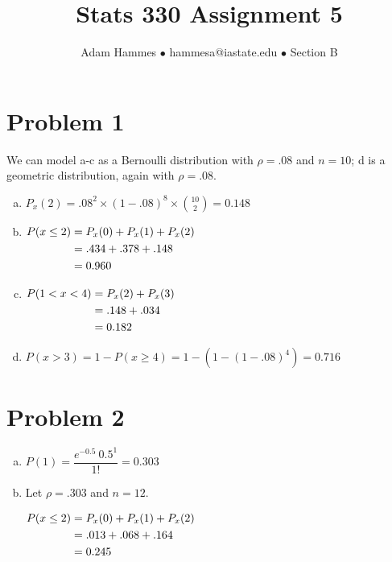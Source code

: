 \documentclass[11pt]{article}
\newenvironment{equ}{$\hfill\begin{aligned}[t]}{\end{aligned}\hfill \null$}
\begin{document}
\title{\vspace{-8ex}Stats 330 Assignment 5}
\author{Adam Hammes $\bullet$ hammesa@iastate.edu $\bullet$ Section B}
\maketitle

\section*{Problem 1}
We can model a-c as a Bernoulli distribution with $\rho = .08$ and $n=10$; d is a geometric distribution, again with $\rho = .08$.


\begin{enumerate}[(a)]	
	\item $P_x(2) = .08^2 \times (1-.08)^8 \times \binom{10}{2} = 0.148$
	\item
		\begin{equ}
			P(x \leq 2)&= P_x(0) + P_x(1) + P_x(2) \\
			&= .434 + .378 + .148 \\
			&=0 .960
		\end{equ}
	\item
		\begin{equ}
			P( 1 < x < 4) &= P_x(2) + P_x(3) \\
			&= .148 + .034 \\
			&= 0.182
		\end{equ}
	\item $P( x > 3 ) =1- P( x \geq 4) = 1-(1- (1-.08)^4) = 0.716$
\end{enumerate}

\section*{Problem 2}

\begin{enumerate}[(a)]
	\item $P(1) = \dfrac{e^{-0.5}\ 0.5 ^ 1}{1!} = 0.303$
	\item Let $\rho = .303$ and $n =12$.
	
		\begin{equ}
			P(x \leq 2) &= P_x(0) + P_x(1) + P_x(2) \\
			&= .013 + .068 + .164 \\
			&= 0.245 \\
		\end{equ}
\end{enumerate}
\end{document}
